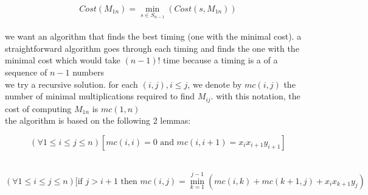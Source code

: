 \documentclass[a4paper,12pt]{article}
\begin{document}
\[
Cost(M_{1n}) = \min_{s \in S_{n-1}}(Cost(s,M_{1n}))
\]\\[0pt]
we want an algorithm that finds the best timing (one with the minimal cost). a straightforward algorithm goes through each timing and finds the one with the minimal cost which would take \((n-1)!\) time because a timing is a of a sequence of \(n-1\) numbers\\[0pt]
we try a recursive solution. for each \((i,j),i \le j\), we denote by \(mc(i,j)\) the number of minimal multiplications required to find \(M_{ij}\). with this notation, the cost of computing \(M_{1n}\) is \(mc(1,n)\)\\[0pt]
the algorithm is based on the following 2 lemmas:\\[0pt]
\begin{lemma}
\[
(\forall 1 \le i \le j \le n)[mc(i,i)=0 \text{ and } mc(i,i+1)=x_ix_{i+1}y_{i+1}]
\]\\[0pt]
\end{lemma}
\begin{lemma}
\[
(\forall 1 \le i \le j \le n)[\text{if } j>i+1 \text{ then } mc(i,j)=\min_{k=1}^{j-1}(mc(i,k)+mc(k+1,j)+x_ix_{k+1}y_j)
\]\\[0pt]
\end{lemma}
\\[0pt]
\end{document}
